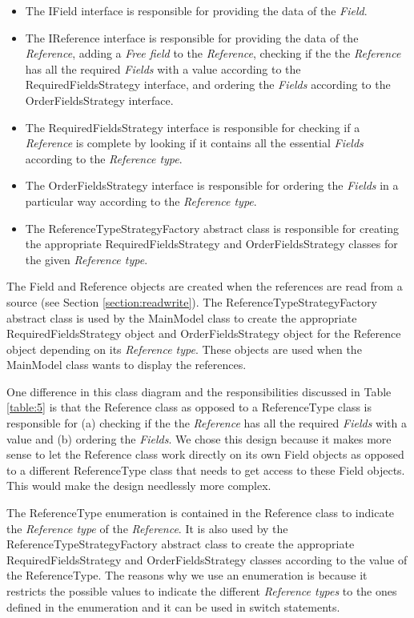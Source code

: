 \documentclass[a4paper]{article}
\begin{document}
\begin{itemize}
	\item The IField interface is responsible for providing the data of the \textit{Field}.
	\item The IReference interface is responsible for providing the data of the \textit{Reference}, adding a \textit{Free field} to the \textit{Reference}, checking if the the \textit{Reference} has all the required \textit{Fields} with a value according to the RequiredFieldsStrategy interface, and ordering the \textit{Fields} according to the OrderFieldsStrategy interface.
	\item The RequiredFieldsStrategy interface is responsible for checking if a \textit{Reference} is complete by looking if it contains all the essential \textit{Fields} according to the \textit{Reference type}.
	\item The OrderFieldsStrategy interface is responsible for ordering the \textit{Fields} in a particular way according to the \textit{Reference type}.
	\item The ReferenceTypeStrategyFactory abstract class is responsible for creating the appropriate RequiredFieldsStrategy and OrderFieldsStrategy classes for the given \textit{Reference type}.
\end{itemize}

The Field and Reference objects are created when the references are read from a source (see Section \ref{section:readwrite}). The ReferenceTypeStrategyFactory abstract class is used by the MainModel class to create the appropriate RequiredFieldsStrategy object and OrderFieldsStrategy object for the Reference object depending on its \textit{Reference type}. These objects are used when the MainModel class wants to display the references.

One difference in this class diagram and the responsibilities discussed in Table \ref{table:5} is that the Reference class as opposed to a ReferenceType class is responsible for (a) checking if the the \textit{Reference} has all the required \textit{Fields} with a value and (b) ordering the \textit{Fields}. We chose this design because it makes more sense to let the Reference class work directly on its own Field objects as opposed to a different ReferenceType class that needs to get access to these Field objects. This would make the design needlessly more complex.

The ReferenceType enumeration is contained in the Reference class to indicate the \textit{Reference type} of the \textit{Reference}. It is also used by the ReferenceTypeStrategyFactory abstract class to create the appropriate RequiredFieldsStrategy and OrderFieldsStrategy classes according to the value of the ReferenceType. The reasons why we use an enumeration is because it restricts the possible values to indicate the different \textit{Reference types} to the ones defined in the enumeration and it can be used in switch statements.
\end{document}
